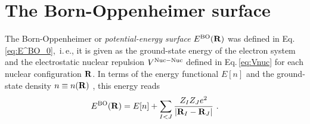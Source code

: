 \newpage

\section{The Born-Oppenheimer surface}
The Born-Oppenheimer or \emph{potential-energy surface} $E^{\rm BO} ({\bf R})$ was defined in Eq.\,\eqref{eq:E^BO_0},~i.\,e., it is given as the ground-state energy of the electron system and the electrostatic nuclear repulsion $V^{\rm Nuc-Nuc}$ defined in Eq.\,\eqref{eq:Vnuc} for each nuclear configuration $\bf R$. In terms of the energy functional $E[n]$ and the ground-state density $n \equiv n({\bf R})$ , this energy reads
%
\begin{align}
	E^{\rm BO} ({\bf R}) 
		= E[n] + \sum_{I < J} \frac{Z_{I} Z_{J} e^{2}}{\left|{\bf R}_{I}-{\bf R}_{J}\right|}~.
	\label{eq:E^BO}
\end{align}


